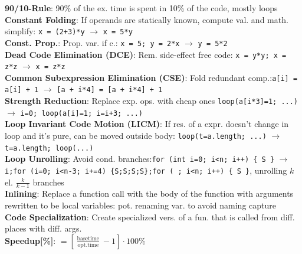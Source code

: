 
\textbf{90/10-Rule}: 90\% of the ex. time is spent in 10\% of the code, mostly loops\\
\textbf{Constant Folding}: If operands are statically known, compute val. and math. simplify: {\scriptsize \texttt{x = (2+3)*y} $\rightarrow$ \texttt{x = 5*y}}\\
\textbf{Const. Prop.}: Prop. var. if c.: {\scriptsize \texttt{x = 5; y = 2*x} $\rightarrow$ \texttt{y = 5*2}}\\
\textbf{Dead Code Elimination (DCE)}: Rem. side-effect free code:  {\scriptsize \texttt{x = y*y; x = z*z} $\rightarrow$ \texttt{x = z*z}} \\
\textbf{Common Subexpression Elimination (CSE)}: Fold redundant comp.:{\scriptsize \texttt{a[i] = a[i] + 1} $\rightarrow$ \texttt{[a + i*4] = [a + i*4] + 1}} \\
\textbf{Strength Reduction}: Replace exp. ops. with cheap ones  {\scriptsize \texttt{loop(a[i*3]=1; ...)} $\rightarrow$ \texttt{i=0; loop(a[i]=1; i=i+3; ...)}}\\
\textbf{Loop Invariant Code Motion (LICM)}: If res. of a expr. doesn't change in loop and it’s pure, can be moved outside body: {\scriptsize \texttt{loop(t=a.length; ...)} $\rightarrow$ \texttt{t=a.length; loop(...)}} \\
\textbf{Loop Unrolling}: Avoid cond. branches:{\scriptsize \texttt{for (int i=0; i<n; i++) \{ S \}} $\rightarrow$ \texttt{i;for (i=0; i<n-3; i+=4) \{S;S;S;S\};for ( ; i<n; i++) \{ S \}}}, unrolling $k$ el. $\frac{k}{k-1}$ branches \\
\textbf{Inlining}: Replace a function call with the body of the function with arguments rewritten to be local variables: pot. renaming var. to avoid naming capture\\
\textbf{Code Specialization}: Create specialized vers. of a fun. that is called from
diff. places with diff. args.\\
\textbf{Speedup[\%]}: $=\left[\frac{\operatorname{base time}}{\operatorname{opt. time}}-1\right]\cdot 100 \%$   





